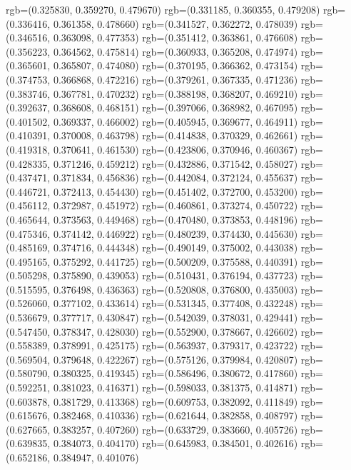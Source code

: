 {{{					rgb=(0.325830, 0.359270, 0.479670)
					rgb=(0.331185, 0.360355, 0.479208)
					rgb=(0.336416, 0.361358, 0.478660)
					rgb=(0.341527, 0.362272, 0.478039)
					rgb=(0.346516, 0.363098, 0.477353)
					rgb=(0.351412, 0.363861, 0.476608)
					rgb=(0.356223, 0.364562, 0.475814)
					rgb=(0.360933, 0.365208, 0.474974)
					rgb=(0.365601, 0.365807, 0.474080)
					rgb=(0.370195, 0.366362, 0.473154)
					rgb=(0.374753, 0.366868, 0.472216)
					rgb=(0.379261, 0.367335, 0.471236)
					rgb=(0.383746, 0.367781, 0.470232)
					rgb=(0.388198, 0.368207, 0.469210)
					rgb=(0.392637, 0.368608, 0.468151)
					rgb=(0.397066, 0.368982, 0.467095)
					rgb=(0.401502, 0.369337, 0.466002)
					rgb=(0.405945, 0.369677, 0.464911)
					rgb=(0.410391, 0.370008, 0.463798)
					rgb=(0.414838, 0.370329, 0.462661)
					rgb=(0.419318, 0.370641, 0.461530)
					rgb=(0.423806, 0.370946, 0.460367)
					rgb=(0.428335, 0.371246, 0.459212)
					rgb=(0.432886, 0.371542, 0.458027)
					rgb=(0.437471, 0.371834, 0.456836)
					rgb=(0.442084, 0.372124, 0.455637)
					rgb=(0.446721, 0.372413, 0.454430)
					rgb=(0.451402, 0.372700, 0.453200)
					rgb=(0.456112, 0.372987, 0.451972)
					rgb=(0.460861, 0.373274, 0.450722)
					rgb=(0.465644, 0.373563, 0.449468)
					rgb=(0.470480, 0.373853, 0.448196)
					rgb=(0.475346, 0.374142, 0.446922)
					rgb=(0.480239, 0.374430, 0.445630)
					rgb=(0.485169, 0.374716, 0.444348)
					rgb=(0.490149, 0.375002, 0.443038)
					rgb=(0.495165, 0.375292, 0.441725)
					rgb=(0.500209, 0.375588, 0.440391)
					rgb=(0.505298, 0.375890, 0.439053)
					rgb=(0.510431, 0.376194, 0.437723)
					rgb=(0.515595, 0.376498, 0.436363)
					rgb=(0.520808, 0.376800, 0.435003)
					rgb=(0.526060, 0.377102, 0.433614)
					rgb=(0.531345, 0.377408, 0.432248)
					rgb=(0.536679, 0.377717, 0.430847)
					rgb=(0.542039, 0.378031, 0.429441)
					rgb=(0.547450, 0.378347, 0.428030)
					rgb=(0.552900, 0.378667, 0.426602)
					rgb=(0.558389, 0.378991, 0.425175)
					rgb=(0.563937, 0.379317, 0.423722)
					rgb=(0.569504, 0.379648, 0.422267)
					rgb=(0.575126, 0.379984, 0.420807)
					rgb=(0.580790, 0.380325, 0.419345)
					rgb=(0.586496, 0.380672, 0.417860)
					rgb=(0.592251, 0.381023, 0.416371)
					rgb=(0.598033, 0.381375, 0.414871)
					rgb=(0.603878, 0.381729, 0.413368)
					rgb=(0.609753, 0.382092, 0.411849)
					rgb=(0.615676, 0.382468, 0.410336)
					rgb=(0.621644, 0.382858, 0.408797)
					rgb=(0.627665, 0.383257, 0.407260)
					rgb=(0.633729, 0.383660, 0.405726)
					rgb=(0.639835, 0.384073, 0.404170)
					rgb=(0.645983, 0.384501, 0.402616)
					rgb=(0.652186, 0.384947, 0.401076)
}}}
